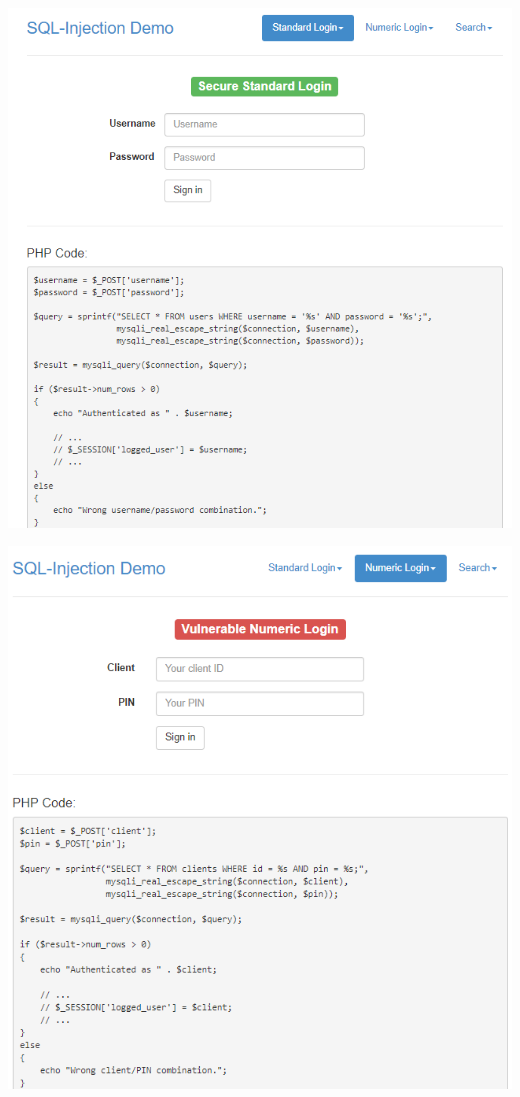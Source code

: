 \documentclass{article}
\begin{document}
\begin{center}
\includegraphics[scale=1]{f3}
\end{center}
\begin{center}
\includegraphics[scale=1]{f4}
\end{center}
\end{document}
